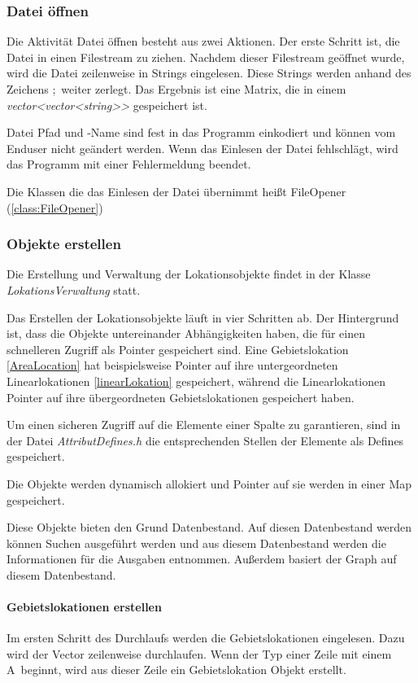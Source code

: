 \documentclass[12pt, a4paper, ngerman]{article}
\begin{document}
\subsubsection{Datei öffnen \label{dateiOeffnen}}
Die Aktivität Datei öffnen besteht aus zwei Aktionen. Der erste Schritt ist, die Datei in einen Filestream zu ziehen. Nachdem dieser Filestream geöffnet wurde, wird die Datei zeilenweise in Strings eingelesen. Diese Strings werden anhand des Zeichens \glqq ;\grqq~weiter zerlegt. Das Ergebnis ist eine Matrix, die in einem \textit{vector\textless vector\textless string\textgreater \textgreater} gespeichert ist.

Datei Pfad und -Name sind fest in das Programm einkodiert und können vom Enduser nicht geändert werden. Wenn das Einlesen der Datei fehlschlägt, wird das Programm mit einer Fehlermeldung beendet.

Die Klassen die das Einlesen der Datei übernimmt heißt FileOpener (\ref{class:FileOpener})
\subsubsection{Objekte erstellen \label{objekteErstellen}}
Die Erstellung und Verwaltung der Lokationsobjekte findet in der Klasse \textit{LokationsVerwaltung} statt. 

Das Erstellen der Lokationsobjekte läuft in vier Schritten ab. Der Hintergrund ist, dass die Objekte untereinander Abhängigkeiten haben, die für einen schnelleren Zugriff als Pointer gespeichert sind. Eine Gebietslokation  \ref{AreaLocation} hat beispielsweise Pointer auf ihre untergeordneten Linearlokationen \ref{linearLokation} gespeichert, während die Linearlokationen Pointer auf ihre übergeordneten Gebietslokationen gespeichert haben.

Um einen sicheren Zugriff auf die Elemente einer Spalte zu garantieren, sind in der Datei \textit{AttributDefines.h} die entsprechenden Stellen der Elemente als Defines gespeichert.

Die Objekte werden dynamisch allokiert und Pointer auf sie werden in einer Map gespeichert.  

Diese Objekte bieten den Grund Datenbestand. Auf diesen Datenbestand werden können Suchen ausgeführt werden und aus diesem Datenbestand werden die Informationen für die Ausgaben entnommen. Außerdem basiert der Graph auf diesem Datenbestand.

\paragraph{Gebietslokationen erstellen \label{par:gebietsLokationenErstellen}}
Im ersten Schritt des Durchlaufs werden die Gebietslokationen eingelesen. Dazu wird der Vector zeilenweise durchlaufen. Wenn der Typ einer Zeile mit einem \glqq A\grqq~beginnt, wird aus dieser Zeile ein Gebietslokation Objekt erstellt.
\end{document}
